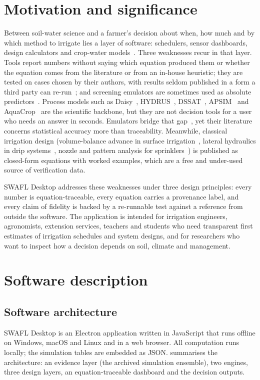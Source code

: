 \documentclass[preprint,12pt]{elsarticle}
\begin{document}
\linenumbers
\section{Motivation and significance}
Between soil-water science and a farmer's decision about when, how much and by which method to irrigate lies a layer of software: schedulers, sensor dashboards, design calculators and crop-water models~\cite{Datta2023,Garcia2020,Jones2004}. Three weaknesses recur in that layer. Tools report numbers without saying which equation produced them or whether the equation comes from the literature or from an in-house heuristic; they are tested on cases chosen by their authors, with results seldom published in a form a third party can re-run~\cite{Hutton2016,Wilkinson2016}; and screening emulators are sometimes used as absolute predictors~\cite{Bennett2013,Moriasi2007}. Process models such as Daisy~\cite{Hansen1991,Hansen2012,Holbak2026}, HYDRUS~\cite{Simunek2008}, DSSAT~\cite{Jones2003}, APSIM~\cite{Keating2003} and AquaCrop~\cite{Steduto2009} are the scientific backbone, but they are not decision tools for a user who needs an answer in seconds. Emulators bridge that gap~\cite{Razavi2012,Asher2015}, yet their literature concerns statistical accuracy more than traceability. Meanwhile, classical irrigation design (volume-balance advance in surface irrigation~\cite{Walker1987,Walker1989}, lateral hydraulics in drip systems~\cite{KellerKarmeli1974,Keller1990}, nozzle and pattern analysis for sprinklers~\cite{Keller1990,Christiansen1942,Playan2005}) is published as closed-form equations with worked examples, which are a free and under-used source of verification data.

SWAFL Desktop addresses these weaknesses under three design principles: every number is equation-traceable, every equation carries a provenance label, and every claim of fidelity is backed by a re-runnable test against a reference from outside the software. The application is intended for irrigation engineers, agronomists, extension services, teachers and students who need transparent first estimates of irrigation schedules and system designs, and for researchers who want to inspect how a decision depends on soil, climate and management.

\section{Software description}
\subsection{Software architecture}
SWAFL Desktop is an Electron application written in JavaScript that runs offline on Windows, macOS and Linux and in a web browser. All computation runs locally; the simulation tables are embedded as JSON.  summarises the architecture: an evidence layer (the archived simulation ensemble), two engines, three design layers, an equation-traceable dashboard and the decision outputs.
\end{document}
